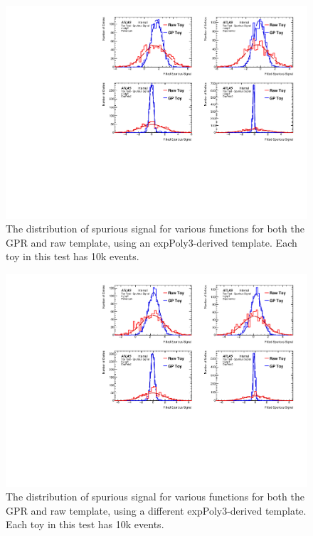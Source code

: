 \begin{figure} 
\begin{center}
  \includegraphics[width=\textwidth]{figures/background/gpr/validation/nominal/ToyTest_FitSigVals_medpT_10k_noSig}   
\caption{The distribution of spurious signal for various functions for both the GPR and raw template, using an expPoly3-derived template. Each toy in this test has 10k events.}
\label{fig:medpt_10k_noSig}
\end{center}
\end{figure}

\begin{figure} 
\begin{center}
  \includegraphics[width=\textwidth]{figures/background/gpr/validation/nominal/ToyTest_FitSigVals_highpT_10k_noSig}   
\caption{The distribution of spurious signal for various functions for both the GPR and raw template, using a different expPoly3-derived template. Each toy in this test has 10k events.}
\label{fig:highpt_10k_noSig}
\end{center}
\end{figure}

